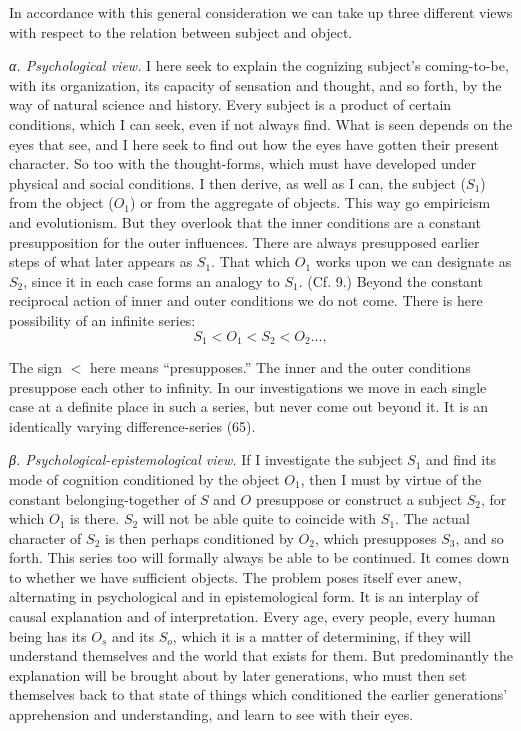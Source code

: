 \documentclass[12pt,a4paper]{book}
\newcommand{\opage}[1]{\marginnote{\footnotesize\textit{[#1]}}}
\begin{document}
In accordance with this general consideration we can take up three different views with
respect to the relation between subject and object.

\emph{α. Psychological view.} I here seek to explain the cognizing subject's
coming-to-be, with its organization, its capacity of sensation and thought, and so
forth, by the way of natural science and history. Every subject is a product of certain
conditions, which I can seek, even if not always find. What is seen depends on the eyes
that see, and I here seek to find out how the eyes have gotten their present character.
So too with the thought-forms, which must have developed under physical and social
conditions. I then derive, as well as I can, the subject ($S_1$) from the object ($O_1$)
or from the aggregate of objects. This way go empiricism and evolutionism. But they
overlook that the inner conditions are a constant presupposition for the outer
influences. There are always presupposed earlier steps of what later appears as $S_1$.
That which $O_1$ works upon we can designate as $S_2$, since it in each case forms an
analogy to $S_1$. (Cf. 9.) Beyond the constant reciprocal action of inner and outer
conditions we do not come. There is here possibility of an infinite series:
\opage{299}\[ S_1 < O_1 < S_2 < O_2 \ldots, \]

The sign $<$ here means ``presupposes.'' The inner and the outer conditions presuppose
each other to infinity. In our investigations we move in each single case at a definite
place in such a series, but never come out beyond it. It is an identically varying
difference-series (65).

\emph{β. Psychological-epistemological view.} If I investigate the subject $S_1$ and find
its mode of cognition conditioned by the object $O_1$, then I must by virtue of the
constant belonging-together of $S$ and $O$ presuppose or construct a subject $S_2$, for
which $O_1$ is there. $S_2$ will not be able quite to coincide with $S_1$. The actual
character of $S_2$ is then perhaps conditioned by $O_2$, which presupposes $S_3$, and so
forth. This series too will formally always be able to be continued. It comes down to
whether we have sufficient objects. The problem poses itself ever anew, alternating in
psychological and in epistemological form. It is an interplay of causal explanation and
of interpretation. Every age, every people, every human being has its $O_s$ and its
$S_o$, which it is a matter of determining, if they will understand themselves and the
world that exists for them. But predominantly the explanation will be brought about by
later generations, who must then set themselves back to that state of things which
conditioned the earlier generations' apprehension and understanding, and learn to see
with their eyes.
\end{document}

